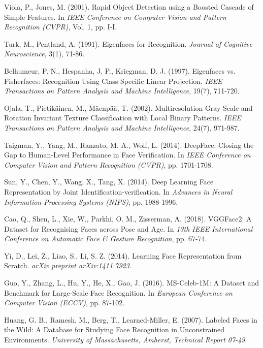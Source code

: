 \documentclass[12pt,a4paper]{report}
\begin{document}
\begin{thebibliography}{50}
Viola, P., Jones, M. (2001). Rapid Object Detection using a Boosted Cascade of Simple Features. In \textit{IEEE Conference on Computer Vision and Pattern Recognition (CVPR)}, Vol. 1, pp. I-I.

Turk, M., Pentland, A. (1991). Eigenfaces for Recognition. \textit{Journal of Cognitive Neuroscience}, 3(1), 71-86.

Belhumeur, P. N., Hespanha, J. P., Kriegman, D. J. (1997). Eigenfaces vs. Fisherfaces: Recognition Using Class Specific Linear Projection. \textit{IEEE Transactions on Pattern Analysis and Machine Intelligence}, 19(7), 711-720.

Ojala, T., Pietikäinen, M., Mäenpää, T. (2002). Multiresolution Gray-Scale and Rotation Invariant Texture Classification with Local Binary Patterns. \textit{IEEE Transactions on Pattern Analysis and Machine Intelligence}, 24(7), 971-987.

Taigman, Y., Yang, M., Ranzato, M. A., Wolf, L. (2014). DeepFace: Closing the Gap to Human-Level Performance in Face Verification. In \textit{IEEE Conference on Computer Vision and Pattern Recognition (CVPR)}, pp. 1701-1708.

Sun, Y., Chen, Y., Wang, X., Tang, X. (2014). Deep Learning Face Representation by Joint Identification-verification. In \textit{Advances in Neural Information Processing Systems (NIPS)}, pp. 1988-1996.

Cao, Q., Shen, L., Xie, W., Parkhi, O. M., Zisserman, A. (2018). VGGFace2: A Dataset for Recognising Faces across Pose and Age. In \textit{13th IEEE International Conference on Automatic Face \& Gesture Recognition}, pp. 67-74.

Yi, D., Lei, Z., Liao, S., Li, S. Z. (2014). Learning Face Representation from Scratch. \textit{arXiv preprint arXiv:1411.7923}.

Guo, Y., Zhang, L., Hu, Y., He, X., Gao, J. (2016). MS-Celeb-1M: A Dataset and Benchmark for Large-Scale Face Recognition. In \textit{European Conference on Computer Vision (ECCV)}, pp. 87-102.

Huang, G. B., Ramesh, M., Berg, T., Learned-Miller, E. (2007). Labeled Faces in the Wild: A Database for Studying Face Recognition in Unconstrained Environments. \textit{University of Massachusetts, Amherst, Technical Report 07-49}.


\end{thebibliography}
\end{document}
